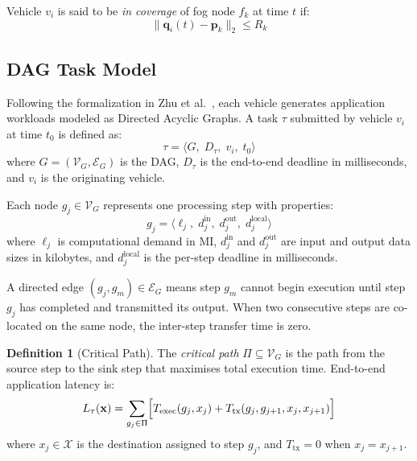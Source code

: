 \documentclass[12pt,a4paper]{article}
\theoremstyle{definition}
\newtheorem{definition}{Definition}[section]
\theoremstyle{remark}
\begin{document}
Vehicle $v_i$ is said to be \emph{in coverage} of fog node $f_k$ at time $t$ if:
\begin{equation}
  \|\bm{q}_i(t) - \bm{p}_k\|_2 \leq R_k
\end{equation}

\subsection{DAG Task Model}

Following the formalization in Zhu et al.~\cite{zhu2025dag}, each vehicle
generates application workloads modeled as Directed Acyclic Graphs. A task
$\tau$ submitted by vehicle $v_i$ at time $t_0$ is defined as:
\begin{equation}
  \tau = \langle G,\; D_\tau,\; v_i,\; t_0 \rangle
\end{equation}
where $G = (\mathcal{V}_G, \mathcal{E}_G)$ is the DAG, $D_\tau$ is the
end-to-end deadline in milliseconds, and $v_i$ is the originating vehicle.

Each node $g_j \in \mathcal{V}_G$ represents one processing step with properties:
\begin{equation}
  g_j = \langle \ell_j,\; d_j^{\text{in}},\; d_j^{\text{out}},\; d_j^{\text{local}} \rangle
\end{equation}
where $\ell_j$ is computational demand in MI, $d_j^{\text{in}}$ and
$d_j^{\text{out}}$ are input and output data sizes in kilobytes, and
$d_j^{\text{local}}$ is the per-step deadline in milliseconds.

A directed edge $(g_j, g_m) \in \mathcal{E}_G$ means step $g_m$ cannot begin
execution until step $g_j$ has completed and transmitted its output. When two
consecutive steps are co-located on the same node, the inter-step transfer time
is zero.

\begin{definition}[Critical Path]
The \emph{critical path} $\Pi \subseteq \mathcal{V}_G$ is the path from the
source step to the sink step that maximises total execution time. End-to-end
application latency is:
\begin{equation}
  L_\tau(\mathbf{x}) = \sum_{g_j \in \Pi} \Bigl[
    T_{\text{exec}}(g_j, x_j) + T_{\text{tx}}(g_j, g_{j+1}, x_j, x_{j+1})
  \Bigr]
  \label{eq:app_latency}
\end{equation}
where $x_j \in \mathcal{X}$ is the destination assigned to step $g_j$, and
$T_{\text{tx}} = 0$ when $x_j = x_{j+1}$.
\end{definition}
\end{document}
